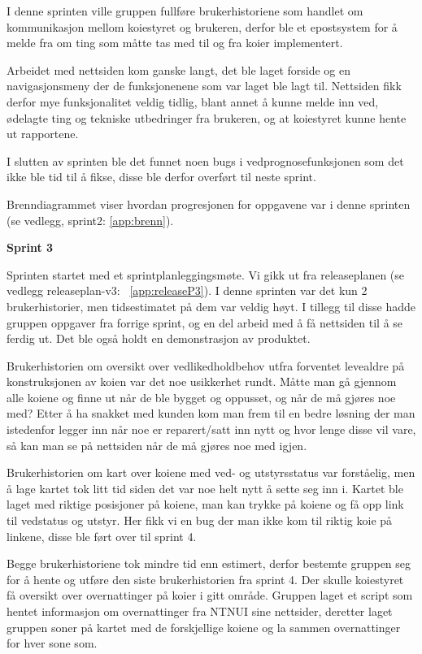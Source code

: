 \documentclass[12pt,a4paper,norsk]{article}
\begin{document}
I denne sprinten ville gruppen fullføre brukerhistoriene som handlet om kommunikasjon mellom koiestyret og brukeren, derfor ble et epostsystem for å melde fra om ting som måtte tas med til og fra koier implementert.

Arbeidet med nettsiden kom ganske langt, det ble laget forside og en navigasjonsmeny der de funksjonenene som var laget ble lagt til. Nettsiden fikk derfor mye funksjonalitet veldig tidlig, blant annet å kunne melde inn ved, ødelagte ting og tekniske utbedringer fra brukeren, og at koiestyret kunne hente ut rapportene.

I slutten av sprinten ble det funnet noen bugs i vedprognosefunksjonen som det ikke ble tid til å fikse, disse ble derfor overført til neste sprint.

Brenndiagrammet viser hvordan progresjonen for oppgavene var i denne sprinten (se vedlegg, sprint2: \cref{app:brenn}).

\bigskip \noindent \textbf{Sprint 3}
\par Sprinten startet med et sprintplanleggingsmøte. Vi gikk ut fra releaseplanen (se vedlegg releaseplan-v3: ~\cref{app:releaseP3}). I denne sprinten var det kun 2 brukerhistorier, men tidsestimatet på dem var veldig høyt. I tillegg til disse hadde gruppen oppgaver fra forrige sprint, og en del arbeid med å få nettsiden til å se ferdig ut. Det ble også holdt en demonstrasjon av produktet.

Brukerhistorien om oversikt over vedlikedholdbehov utfra forventet levealdre på konstruksjonen av koien var det noe usikkerhet rundt. Måtte man gå gjennom alle koiene og finne ut når de ble bygget og oppusset, og når de må gjøres noe med? Etter å ha snakket med kunden kom man frem til en bedre løsning der man istedenfor legger inn når noe er reparert/satt inn nytt og hvor lenge disse vil vare, så kan man se på nettsiden når de må gjøres noe med igjen.

Brukerhistorien om kart over koiene med ved- og utstyrsstatus var forståelig, men å lage kartet tok litt tid siden det var noe helt nytt å sette seg inn i. Kartet ble laget med riktige posisjoner på koiene, man kan trykke på koiene og få opp link til vedstatus og utstyr. Her fikk vi en bug der man ikke kom til riktig koie på linkene, disse ble ført over til sprint 4.

Begge brukerhistoriene tok mindre tid enn estimert, derfor bestemte gruppen seg for å hente og utføre den siste brukerhistorien fra sprint 4. Der skulle koiestyret få oversikt over overnattinger på koier i gitt område. Gruppen laget et script som hentet informasjon om overnattinger fra NTNUI sine nettsider, deretter laget gruppen soner på kartet med de forskjellige koiene og la sammen overnattinger for hver sone som.
\end{document}
